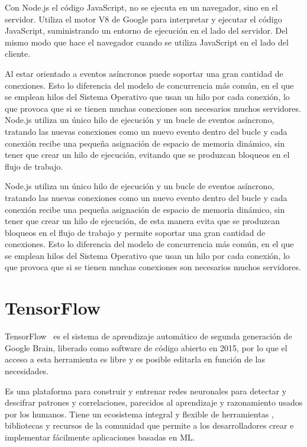\documentclass[a4paper, 12pt]{book}
\begin{document}
Con Node.js el código JavaScript, no se ejecuta en un navegador, sino en el servidor. Utiliza el motor V8 de Google para interpretar y ejecutar el código JavaScript, suministrando un entorno de ejecución en el lado del servidor. Del mismo modo que hace el navegador cuando se utiliza JavaScript en el lado del cliente.

Al estar orientado a eventos asíncronos puede soportar una gran cantidad de conexiones. Esto lo diferencia del modelo de concurrencia más común, en el que se emplean hilos del Sistema Operativo que usan un hilo por cada conexión, lo que provoca que si se tienen muchas conexiones son necesarios muchos servidores. Node.js utiliza un único hilo de ejecución y un bucle de eventos asíncrono, tratando las nuevas conexiones como un nuevo evento dentro del bucle y cada conexión recibe una pequeña asignación de espacio de memoria dinámico, sin tener que crear un hilo de ejecución, evitando que se produzcan bloqueos en el flujo de trabajo. 

Node.js utiliza un único hilo de ejecución y un bucle de eventos asíncrono, tratando las nuevas conexiones como un nuevo evento dentro del bucle y cada conexión recibe una pequeña asignación de espacio de memoria dinámico, sin tener que crear un hilo de ejecución, de esta manera evita que se produzcan bloqueos en el flujo de trabajo y permite soportar una gran cantidad de conexiones. Esto lo diferencia del modelo de concurrencia más común, en el que se emplean hilos del Sistema Operativo que usan un hilo por cada conexión, lo que provoca que si se tienen muchas conexiones son necesarios muchos servidores.

\section{TensorFlow} 
\label{sec:TensorFlow}

TensorFlow~\cite{Pagina_de_TensorFlow} es el sistema de aprendizaje automático de segunda generación de Google Brain, liberado como software de código abierto en 2015, por lo que el acceso a esta herramienta es libre y es posible editarla en función de las necesidades. 

Es una plataforma para construir y entrenar redes neuronales para detectar y descifrar patrones y correlaciones, parecidos al aprendizaje y razonamiento usados por los humanos. Tiene un ecosistema integral y flexible de herramientas , bibliotecas y recursos de la comunidad que permite a los desarrolladores crear e implementar fácilmente aplicaciones basadas en ML.
\end{document}
